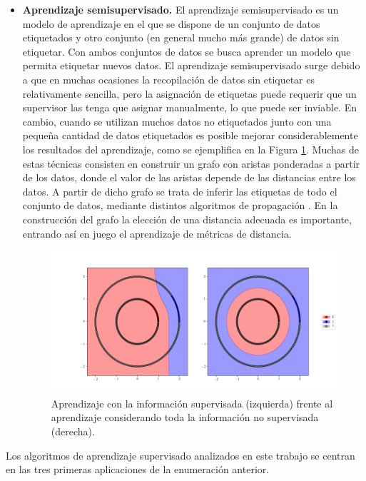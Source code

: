 \begin{itemize}
    \item \textbf{Aprendizaje semisupervisado.} El aprendizaje semisupervisado es un modelo de aprendizaje en el que se dispone de un conjunto de datos etiquetados y otro conjunto (en general mucho más grande) de datos sin etiquetar. Con ambos conjuntos de datos se busca aprender un modelo que permita etiquetar nuevos datos. El aprendizaje semisupervisado surge debido a que en muchas ocasiones la recopilación de datos sin etiquetar es relativamente sencilla, pero la asignación de etiquetas puede requerir que un supervisor las tenga que asignar manualmente, lo que puede ser inviable. En cambio, cuando se utilizan muchos datos no etiquetados junto con una pequeña cantidad de datos etiquetados es posible mejorar considerablemente los resultados del aprendizaje, como se ejemplifica en la Figura \ref{fig:ssl}. Muchas de estas técnicas consisten en construir un grafo con aristas ponderadas a partir de los datos, donde el valor de las aristas depende de las distancias entre los datos. A partir de dicho grafo se trata de inferir las etiquetas de todo el conjunto de datos, mediante distintos algoritmos de propagación \cite{ssl1,ssl2}. En la construcción del grafo la elección de una distancia adecuada es importante, entrando así en juego el aprendizaje de métricas de distancia.

    \begin{figure}[h]
    \centering
    \includegraphics[width=\textwidth]{./images/ssl.png}
    \caption{Aprendizaje con la información supervisada (izquierda) frente al aprendizaje considerando toda la información no supervisada (derecha).} \label{fig:ssl}
    \end{figure}

\end{itemize}

Los algoritmos de aprendizaje supervisado analizados en este trabajo se centran en las tres primeras aplicaciones de la enumeración anterior.

